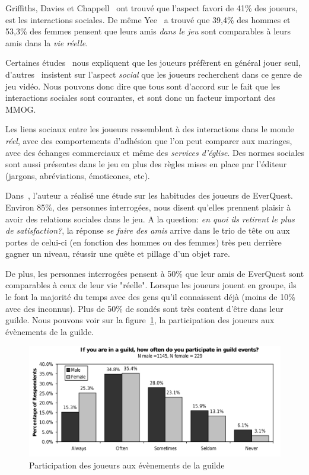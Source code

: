 Griffiths, Davies et Chappell~\cite{BreakingSteretype} ont trouvé que l'aspect favori de 41\% des joueurs, est les interactions sociales. De même Yee~\cite{1159988} a trouvé que 39,4\% des hommes et 53,3\% des femmes pensent que leurs amis \textit{dans le jeu} sont comparables à leurs amis dans la \textit{vie réelle}.
\par Certaines études~\cite{1124834,1031667} nous expliquent que les joueurs préfèrent en général jouer seul, d'autres~\cite{1159988,Jakobsson03thesopranos} insistent sur l'aspect \textit{social} que les joueurs recherchent dans ce genre de jeu vidéo. Nous pouvons donc dire que tous sont d'accord sur le fait que les interactions sociales sont courantes, et sont donc un facteur important des MMOG.
\par Les liens sociaux entre les joueurs ressemblent à des interactions dans le monde \textit{réel}, avec des comportements d'adhésion que l'on peut comparer aux mariages, avec des échanges commerciaux et même des \textit{services d'église}. Des normes sociales sont aussi présentes dans le jeu en plus des règles mises en place par l'éditeur (jargons, abréviations, émoticones, etc).

Dans~\cite{StudyEQ}, l'auteur a réalisé une étude sur les habitudes des joueurs de EverQuest. Environ 85\%, des personnes interrogées, nous disent qu'elles prennent plaisir à avoir des relations sociales dans le jeu. A la question: \textit{en quoi ils retirent le plus de satisfaction?}, la réponse \textit{se faire des amis} arrive dans le trio de tête ou aux portes de celui-ci (en fonction des hommes ou des femmes) très peu derrière gagner un niveau, réussir une quête et pillage d'un objet rare.
\par De plus, les personnes interrogées pensent à 50\% que leur amis de EverQuest sont comparables à ceux de leur vie "réelle". Lorsque les joueurs jouent en groupe, ils le font la majorité du temps avec des gens qu'il connaissent déjà (moins de 10\% avec des inconnus). Plus de 50\% de sondés sont très content d'être dans leur guilde. Nous pouvons voir sur la figure~\ref{guildpres}, la participation des joueurs aux évènements de la guilde.
        \begin{figure}[!h]
        \centering
        \includegraphics[scale=0.75]{./Ressources/Images/studypres.png}
        \caption{Participation des joueurs aux évènements de la guilde}
        \label{guildpres}
        \end{figure}

